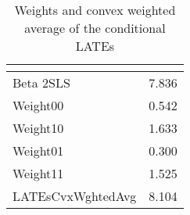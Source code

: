 \begin{table}[htbp]\centering
\caption{Weights and convex weighted average of the conditional LATEs\label{tab:Angrist2}}
\begin{tabular}{l*{1}{c}}
\hline\hline
            &\multicolumn{1}{c}{}\\
\hline
Beta 2SLS   &       7.836\\
\hline
Weight00    &       0.542\\
Weight10    &       1.633\\
Weight01    &       0.300\\
Weight11    &       1.525\\
LATEsCvxWghtedAvg&       8.104\\
\hline\hline
\end{tabular}
\end{table}
